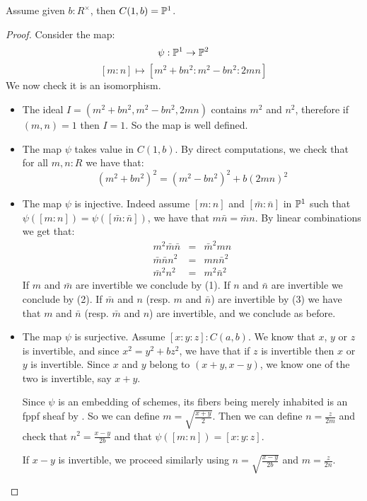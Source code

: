 \begin{lemma}\label{conic-one-split}
Assume given $b:R^\times$, then $C(1,b) = \mathbb{P}^1$.
\end{lemma}

\begin{proof}
Consider the map:
\[\psi:\mathbb{P}^1\to \mathbb{P}^2\]
\[ [m:n]\mapsto \left[m^2+bn^2 : m^2-bn^2 : 2mn\right] \]
We now check it is an isomorphism.
\begin{itemize}

\item The ideal $I = (m^2+bn^2, m^2-bn^2, 2mn)$ contains $m^2$ and $n^2$, therefore if $(m,n)=1$ then $I=1$. So the map is well defined.

\item The map $\psi$ takes value in $C(1,b)$. By direct computations, we check that for all $m,n:R$ we have that:
\[(m^2+bn^2)^2 = (m^2-bn^2)^2 + b(2mn)^2\]

\item The map $\psi$ is injective. Indeed assume $[m:n]$ and $[\bar{m}:\bar{n}]$ in $\mathbb{P}^1$ such that $\psi([m:n])=\psi([\bar{m}:\bar{n}])$, we have that $m\bar{n}=\bar{m}n$. By linear combinations we get that:
\begin{eqnarray}
m^2\bar{m}\bar{n} &=& \bar{m}^2mn\\
\bar{m}\bar{n}n^2 &=& mn\bar{n}^2\\
\bar{m}^2n^2 &=& m^2\bar{n}^2
\end{eqnarray}
If $m$ and $\bar{m}$ are invertible we conclude by (1). If $n$ and $\bar{n}$ are invertible we conclude by (2). If $\bar{m}$ and $n$ (resp. $m$ and $\bar{n}$) are invertible by (3) we have that $m$ and $\bar{n}$ (resp. $\bar{m}$ and $n$) are invertible, and we conclude as before.

\item The map $\psi$ is surjective. Assume $[x:y:z]:C(a,b)$. We know that $x$, $y$ or $z$ is invertible, and since $x^2=y^2+bz^2$, we have that if $z$ is invertible then $x$ or $y$ is invertible. Since $x$ and $y$ belong to $(x+y, x-y)$, we know one of the two is invertible, say $x+y$. 

Since $\psi$ is an embedding of schemes, its fibers being merely inhabited is an fppf sheaf by . So we can define $m=\sqrt{\frac{x+y}{2}}$. Then we can define $n=\frac{z}{2m}$ and check that $n^2 = \frac{x-y}{2b}$ and that $\psi([m:n]) = [x:y:z]$. 

If $x-y$ is invertible, we proceed similarly using $n=\sqrt{\frac{x-y}{2b}}$ and $m=\frac{z}{2n}$.
\end{itemize}
\end{proof}

